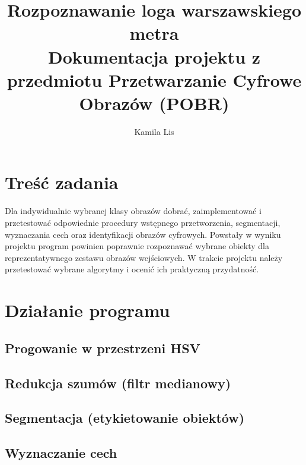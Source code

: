 \documentclass{article}
\date{}
\author{Kamila Lis}
\title{Rozpoznawanie loga warszawskiego metra\\
	{\large Dokumentacja projektu z przedmiotu Przetwarzanie Cyfrowe Obrazów (POBR)}}
\begin{document}
	\maketitle

\section{Treść zadania}
Dla indywidualnie wybranej klasy obrazów dobrać, zaimplementować i przetestować odpowiednie procedury wstępnego przetworzenia, segmentacji, wyznaczania cech oraz identyfikacji obrazów cyfrowych. Powstały w wyniku projektu program powinien poprawnie rozpoznawać wybrane obiekty dla reprezentatywnego zestawu obrazów wejściowych. W trakcie projektu należy przetestować wybrane algorytmy i ocenić ich praktyczną przydatność.

\section{Działanie programu}
\subsection{Progowanie w przestrzeni HSV}
\subsection{Redukcja szumów (filtr medianowy)}
\subsection{Segmentacja (etykietowanie obiektów)}
\subsection{Wyznaczanie cech}

	
\end{document}
